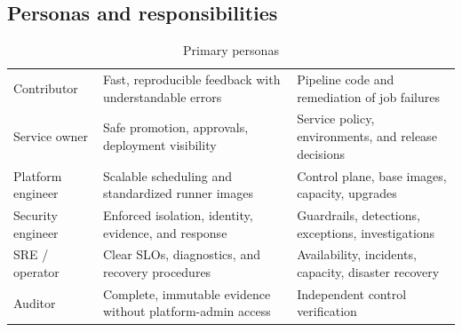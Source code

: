 \subsection{Personas and responsibilities}

\begin{table}[htbp]
\centering
\caption{Primary personas}
\label{tab:personas}
\begin{tabularx}{\textwidth}{@{}L{0.23\textwidth}Y Y@{}}
  \toprule
   &  &  \\
  \midrule
  Contributor & Fast, reproducible feedback with understandable errors & Pipeline code and remediation of job failures \\
  Service owner & Safe promotion, approvals, deployment visibility & Service policy, environments, and release decisions \\
  Platform engineer & Scalable scheduling and standardized runner images & Control plane, base images, capacity, upgrades \\
  Security engineer & Enforced isolation, identity, evidence, and response & Guardrails, detections, exceptions, investigations \\
  SRE / operator & Clear SLOs, diagnostics, and recovery procedures & Availability, incidents, capacity, disaster recovery \\
  Auditor & Complete, immutable evidence without platform-admin access & Independent control verification \\
  \bottomrule
\end{tabularx}
\end{table}

